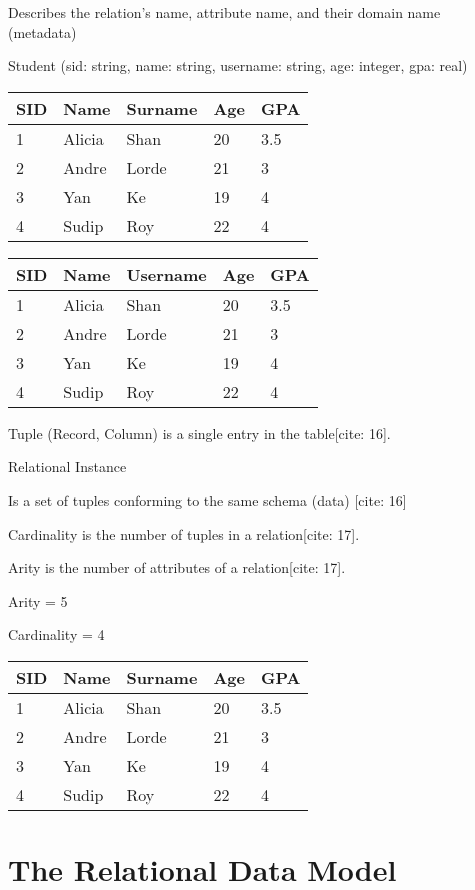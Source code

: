 \documentclass{article}
\begin{document}
Describes the relation's name, attribute name, and their domain name (metadata)

Student (sid: string, name: string, username: string, age: integer, gpa: real)

\begin{tabular}{lllll}
\hline
SID & Name & Surname & Age & GPA \\
\hline
1 & Alicia & Shan & 20 & 3.5 \\
2 & Andre & Lorde & 21 & 3 \\
3 & Yan & Ke & 19 & 4 \\
4 & Sudip & Roy & 22 & 4 \\
\hline
\end{tabular}

\begin{tabular}{lllll}
\hline
SID & Name & Username & Age & GPA \\
\hline
1 & Alicia & Shan & 20 & 3.5 \\
2 & Andre & Lorde & 21 & 3 \\
3 & Yan & Ke & 19 & 4 \\
4 & Sudip & Roy & 22 & 4 \\
\hline
\end{tabular}

Tuple (Record, Column) is a single entry in the table[cite: 16].

Relational Instance

Is a set of tuples conforming to the same schema (data) [cite: 16]

Cardinality is the number of tuples in a relation[cite: 17].

Arity is the number of attributes of a relation[cite: 17].

Arity = 5

Cardinality = 4

\begin{tabular}{lllll}
\hline
SID & Name & Surname & Age & GPA \\
\hline
1 & Alicia & Shan & 20 & 3.5 \\
2 & Andre & Lorde & 21 & 3 \\
3 & Yan & Ke & 19 & 4 \\
4 & Sudip & Roy & 22 & 4 \\
\hline
\end{tabular}

\section*{The Relational Data Model}
\end{document}
